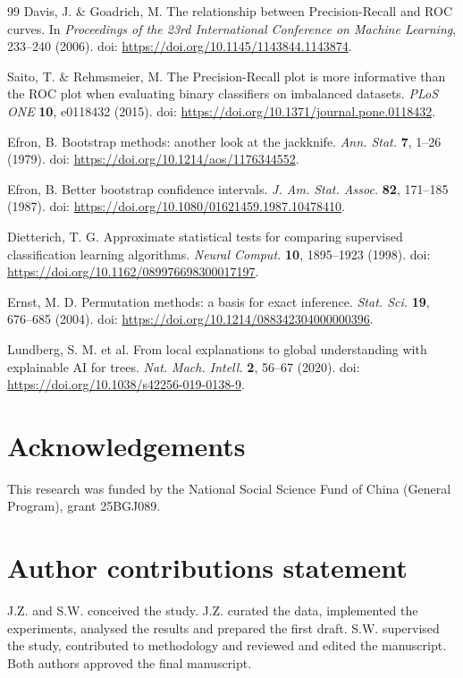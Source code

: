 \documentclass[fleqn,10pt]{wlscirep}
\begin{document}
\begin{thebibliography}{99}
Davis, J. \& Goadrich, M. The relationship between Precision-Recall and ROC curves. In \emph{Proceedings of the 23rd International Conference on Machine Learning}, 233--240 (2006). doi: \url{https://doi.org/10.1145/1143844.1143874}.

Saito, T. \& Rehmsmeier, M. The Precision-Recall plot is more informative than the ROC plot when evaluating binary classifiers on imbalanced datasets. \emph{PLoS ONE} \textbf{10}, e0118432 (2015). doi: \url{https://doi.org/10.1371/journal.pone.0118432}.

Efron, B. Bootstrap methods: another look at the jackknife. \emph{Ann. Stat.} \textbf{7}, 1--26 (1979). doi: \url{https://doi.org/10.1214/aos/1176344552}.

Efron, B. Better bootstrap confidence intervals. \emph{J. Am. Stat. Assoc.} \textbf{82}, 171--185 (1987). doi: \url{https://doi.org/10.1080/01621459.1987.10478410}.

Dietterich, T. G. Approximate statistical tests for comparing supervised classification learning algorithms. \emph{Neural Comput.} \textbf{10}, 1895--1923 (1998). doi: \url{https://doi.org/10.1162/089976698300017197}.

Ernst, M. D. Permutation methods: a basis for exact inference. \emph{Stat. Sci.} \textbf{19}, 676--685 (2004). doi: \url{https://doi.org/10.1214/088342304000000396}.

Lundberg, S. M. et al. From local explanations to global understanding with explainable AI for trees. \emph{Nat. Mach. Intell.} \textbf{2}, 56--67 (2020). doi: \url{https://doi.org/10.1038/s42256-019-0138-9}.

\end{thebibliography}


\section*{Acknowledgements}

This research was funded by the National Social Science Fund of China (General Program), grant 25BGJ089.

\section*{Author contributions statement}

J.Z. and S.W. conceived the study. J.Z. curated the data, implemented the experiments, analysed the results and prepared the first draft. S.W. supervised the study, contributed to methodology and reviewed and edited the manuscript. Both authors approved the final manuscript.
\end{document}
